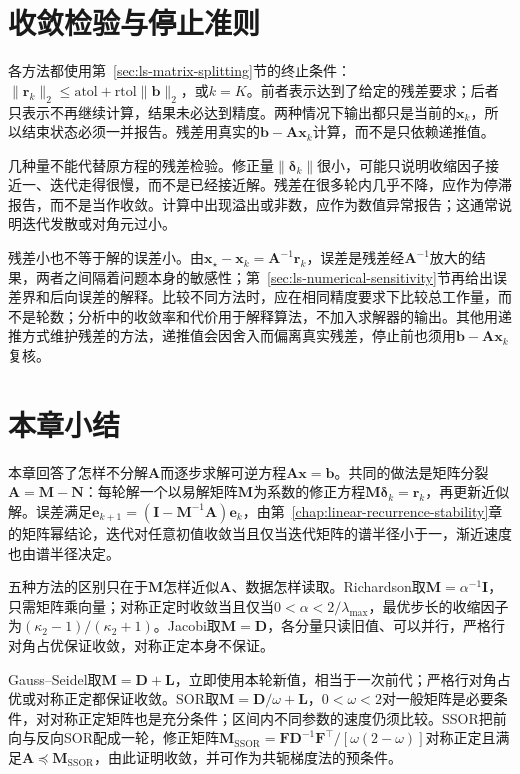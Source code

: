 \section{收敛检验与停止准则}
\label{sec:ls-stationary-stopping}

各方法都使用第~\ref{sec:ls-matrix-splitting}节的终止条件：$\lVert\bm r_k\rVert_2\leq\mathrm{atol}+\mathrm{rtol}\lVert\bm b\rVert_2$，或$k=K$。前者表示达到了给定的残差要求；后者只表示不再继续计算，结果未必达到精度。两种情况下输出都只是当前的$\bm x_k$，所以结束状态必须一并报告。残差用真实的$\bm b-\bm A\bm x_k$计算，而不是只依赖递推值。

几种量不能代替原方程的残差检验。修正量$\lVert\bm\delta_k\rVert$很小，可能只说明收缩因子接近一、迭代走得很慢，而不是已经接近解。残差在很多轮内几乎不降，应作为停滞报告，而不是当作收敛。计算中出现溢出或非数，应作为数值异常报告；这通常说明迭代发散或对角元过小。

残差小也不等于解的误差小。由$\bm x_\star-\bm x_k=\bm A^{-1}\bm r_k$，误差是残差经$\bm A^{-1}$放大的结果，两者之间隔着问题本身的敏感性；第~\ref{sec:ls-numerical-sensitivity}节再给出误差界和后向误差的解释。比较不同方法时，应在相同精度要求下比较总工作量，而不是轮数；分析中的收敛率和代价用于解释算法，不加入求解器的输出。其他用递推方式维护残差的方法，递推值会因舍入而偏离真实残差，停止前也须用$\bm b-\bm A\bm x_k$复核。

\FloatBarrier
\section{本章小结}
\label{sec:stationary-iterations-summary}

本章回答了怎样不分解$\bm A$而逐步求解可逆方程$\bm A\bm x=\bm b$。共同的做法是矩阵分裂$\bm A=\bm M-\bm N$：每轮解一个以易解矩阵$\bm M$为系数的修正方程$\bm M\bm\delta_k=\bm r_k$，再更新近似解。误差满足$\bm e_{k+1}=(\bm I-\bm M^{-1}\bm A)\bm e_k$，由第~\ref{chap:linear-recurrence-stability}章的矩阵幂结论，迭代对任意初值收敛当且仅当迭代矩阵的谱半径小于一，渐近速度也由谱半径决定。

五种方法的区别只在于$\bm M$怎样近似$\bm A$、数据怎样读取。Richardson取$\bm M=\alpha^{-1}\bm I$，只需矩阵乘向量；对称正定时收敛当且仅当$0<\alpha<2/\lambda_{\max}$，最优步长的收缩因子为$(\kappa_2-1)/(\kappa_2+1)$。Jacobi取$\bm M=\bm D$，各分量只读旧值、可以并行，严格行对角占优保证收敛，对称正定本身不保证。

Gauss--Seidel取$\bm M=\bm D+\bm L$，立即使用本轮新值，相当于一次前代；严格行对角占优或对称正定都保证收敛。SOR取$\bm M=\bm D/\omega+\bm L$，$0<\omega<2$对一般矩阵是必要条件，对对称正定矩阵也是充分条件；区间内不同参数的速度仍须比较。SSOR把前向与反向SOR配成一轮，修正矩阵$\bm M_{\mathrm{SSOR}}=\bm F\bm D^{-1}\bm F^\top/[\omega(2-\omega)]$对称正定且满足$\bm A\preceq\bm M_{\mathrm{SSOR}}$，由此证明收敛，并可作为共轭梯度法的预条件。

